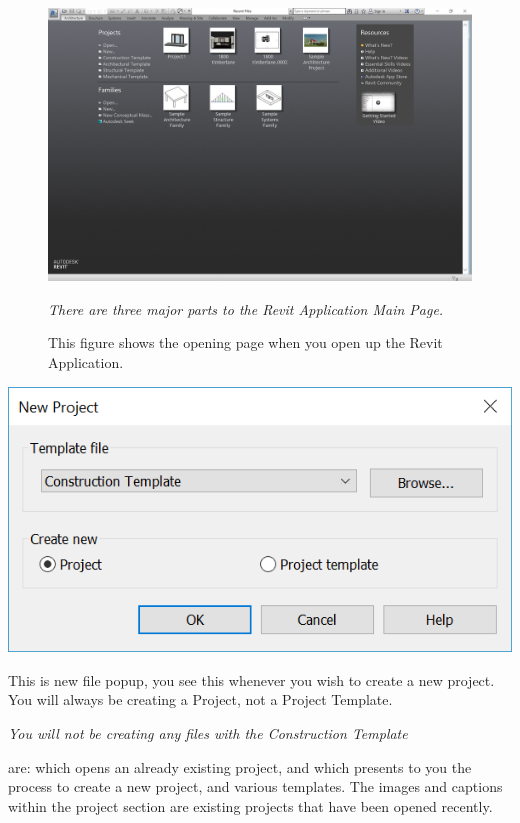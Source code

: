 \documentclass{tufte-book} %
\begin{document}
\begin{figure}
	\includegraphics[width=\linewidth]{revitmainscene.PNG}
	\caption[The revit start page]{This figure shows the opening page when you open up the Revit Application.}
	\emph{There are three major parts to the Revit Application Main Page.}
	\label{fig:revmainscene}
\end{figure}
\begin{marginfigure}
	\includegraphics[width=\linewidth]{revitnewfile.png}
	\caption[A revit New file popup]{This is new file popup, you see this whenever you wish to create a new project. You will always be creating a Project, not a Project Template.}
	\emph{You will not be creating any files with the Construction Template}
	\label{fig:revnewfile}
\end{marginfigure}


 are:  which opens an already existing project, and  which presents to you the process to create a new project, and various templates. The images and captions within the project section are existing projects that have been opened recently.
\end{document}
